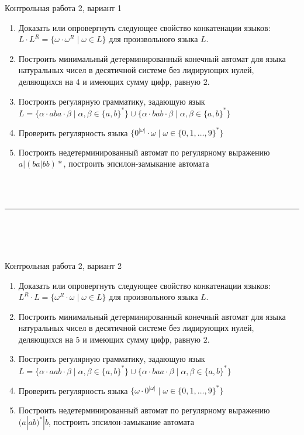 \documentclass[12pt]{article}
\begin{document}

{\Large Контрольная работа 2, вариант 1}
\bigskip

\begin{enumerate}
  \item Доказать или опровергнуть следующее свойство конкатенации языков: $L \cdot L^R = \{ \omega \cdot \omega^R \mid \omega \in L \}$ для произвольного языка $L$.
  \item Построить минимальный детерминированный конечный автомат для языка натуральных чисел в десятичной системе без лидирующих нулей, деляющихся на $4$ и имеющих сумму цифр, равную $2$.
  \item Построить регулярную грамматику, задающую язык \\ $ L = \{ \alpha \cdot a b a \cdot \beta \mid \alpha, \beta \in \{ a, b \}^* \} \cup \{ \alpha \cdot b a b \cdot \beta \mid \alpha, \beta \in \{ a, b \}^* \} $
  \item Проверить регулярность языка $\{ 0^{|\omega|} \cdot \omega \mid \omega \in \{ 0, 1, \dots, 9 \}^* \} $
  \item {Построить недетерминированный автомат по регулярному выражению $ a|(ba|bb)* $, построить эпсилон-замыкание автомата }
\end{enumerate}

\bigskip

~\\~

\bigskip

\rule{\textwidth}{1pt}

\bigskip

~\\~\\~

\bigskip


{\Large Контрольная работа 2, вариант 2}
\bigskip

\begin{enumerate}
  \item Доказать или опровергнуть следующее свойство конкатенации языков: $L^R \cdot L = \{ \omega^R \cdot \omega \mid \omega \in L \}$ для произвольного языка $L$.
\item Построить минимальный детерминированный конечный автомат для языка натуральных чисел в десятичной системе без лидирующих нулей, деляющихся на $5$ и имеющих сумму цифр, равную $2$.
  \item Построить регулярную грамматику, задающую язык \\ $ L = \{ \alpha \cdot a a b \cdot \beta \mid \alpha, \beta \in \{ a, b \}^* \} \cup \{ \alpha \cdot b a a \cdot \beta \mid \alpha, \beta \in \{ a, b \}^* \} $
  \item Проверить регулярность языка $\{ \omega \cdot 0^{|\omega|} \mid \omega \in \{ 0, 1, \dots, 9 \}^* \} $
  \item {Построить недетерминированный автомат по регулярному выражению $ (a|ab)^* | b $, построить эпсилон-замыкание автомата }
\end{enumerate}
\end{document}
